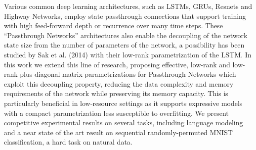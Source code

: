 Various common deep learning architectures, such as LSTMs, GRUs, Resnets and Highway Networks, employ state passthrough connections that support training with high feed-forward depth or recurrence over many time steps. These ``Passthrough Networks'' architectures also enable the decoupling of the network state size from the number of parameters of the network, a possibility has been studied by Sak et al. (2014) with their low-rank parametrization of the LSTM. In this work we extend this line of research, proposing effective, low-rank and low-rank plus diagonal matrix parametrizations for Passthrough Networks which exploit this decoupling property, reducing the data complexity and memory requirements of the network while preserving its memory capacity. This is particularly beneficial in low-resource settings as it supports expressive models with a compact parametrization less susceptible to overfitting. We present competitive experimental results on several tasks, including language modeling and a near state of the art result on sequential randomly-permuted MNIST classification, a hard task on natural data.
